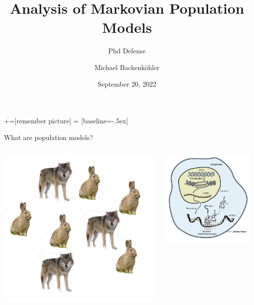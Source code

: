 \documentclass[9pt]{beamer}
\title{Analysis of Markovian Population Models}
\subtitle{Phd Defense}
\author{Michael Backenk\"{o}hler}
\institute{Saarland Informatics Campus}
\date{September 20, 2022}
\begin{document}
+=[remember picture]
 = [baseline=-.5ex]

\begin{frame}
\titlepage
\end{frame}

\begin{frame}{What are population models?}
    \begin{columns}
        \begin{column}{.3\paperwidth}
            \includegraphics[width=\textwidth]{../gfx/population_wolf_rabbit.png}
        \end{column}
        \begin{column}{.3\paperwidth}
            \includegraphics[width=\textwidth]{../gfx/expression.jpg}

\end{column}
\end{columns}
\end{frame}
\end{document}
